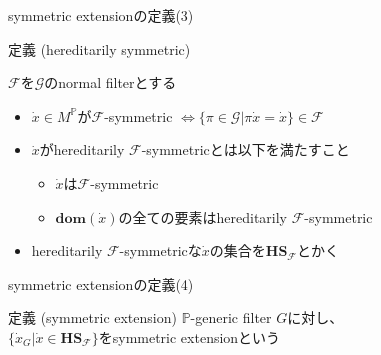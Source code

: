 \documentclass[17pt,aspectratio=169]{beamer}
\newcommand{\Pbb}{\mathbb{P}}
\newcommand{\Gcal}{\mathcal{G}}
\newcommand{\Fcal}{\mathcal{F}}
\begin{document}
\begin{frame}{symmetric extensionの定義(3)}
    \begin{itembox}[l]{定義 (hereditarily symmetric)}
        {\small
            $\Fcal$を$\Gcal$のnormal filterとする
            \vspace{5pt}
            \begin{itemize}
                \setlength{\itemsep}{2pt}
                \vspace{-10pt}
                \item $\dot{x} \in M^\Pbb$が$\Fcal$-symmetric $\Leftrightarrow \{ \pi \in \Gcal | \pi \dot{x} = \dot{x} \} \in \Fcal$
                \item $\dot{x}$がhereditarily $\Fcal$-symmetricとは以下を満たすこと
                      \vspace{-3pt}
                      \begin{itemize}
                          \item $\dot{x}$は$\Fcal$-symmetric
                          \item $\bm{\mathbf{dom}}(\dot{x})$の全ての要素はhereditarily $\Fcal$-symmetric
                      \end{itemize}
                \item hereditarily $\Fcal$-symmetricな$\dot{x}$の集合を$\bm{\mathbf{HS}}_{\Fcal}$とかく

            \end{itemize}
        }
    \end{itembox}
\end{frame}

\begin{frame}{symmetric extensionの定義(4)}
    \begin{itembox}[l]{定義 (symmetric extension)}
        {\small
            $\Pbb$-generic filter $G$に対し、\\$\{ \dot{x}_G | \dot{x} \in \bm{\mathbf{HS}}_{\Fcal} \}$をsymmetric extensionという
        }
    \end{itembox}
\end{frame}
\end{document}
